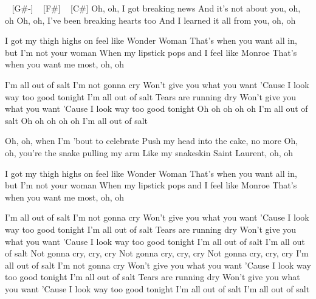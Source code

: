 \begin{guitar}
[Eb-] ~ [G#-] ~ [F#] ~ [C#]
Oh, oh, I got breaking news
And it's not about you, oh, oh
Oh, oh, I've been breaking hearts too
And I learned it all from you, oh, oh

I got my thigh highs on feel like Wonder Woman
That's when you want all in, but I'm not your woman
When my lipstick pops and I feel like Monroe
That's when you want me most, oh, oh

I'm all out of salt
I'm not gonna cry
Won't give you what you want
'Cause I look way too good tonight
I'm all out of salt
Tears are running dry
Won't give you what you want
'Cause I look way too good tonight
Oh oh oh oh oh 
I'm all out of salt
Oh oh oh oh oh 
I'm all out of salt

Oh, oh, when I'm 'bout to celebrate
Push my head into the cake, no more
Oh, oh, you're the snake pulling my arm
Like my snakeskin Saint Laurent, oh, oh

I got my thigh highs on feel like Wonder Woman
That's when you want all in, but I'm not your woman
When my lipstick pops and I feel like Monroe
That's when you want me most, oh, oh

I'm all out of salt
I'm not gonna cry
Won't give you what you want
'Cause I look way too good tonight
I'm all out of salt
Tears are running dry
Won't give you what you want
'Cause I look way too good tonight
I'm all out of salt
I'm all out of salt
Not gonna cry, cry, cry
Not gonna cry, cry, cry
Not gonna cry, cry, cry
I'm all out of salt
I'm not gonna cry
Won't give you what you want
'Cause I look way too good tonight
I'm all out of salt
Tears are running dry
Won't give you what you want
'Cause I look way too good tonight
I'm all out of salt
I'm all out of salt

\end{guitar}